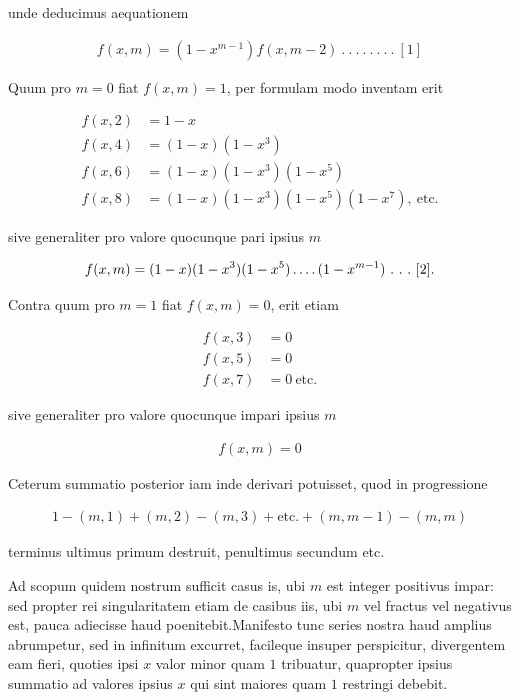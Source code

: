 unde deducimus aequationem

\[
\begin{aligned}
f(x,m)=(1-x^{m-1})f(x,m-2)\ .\ .\ .\ .\ .\ .\ .\ .\ [1]
\end{aligned}
\]


Quum pro $m=0$ fiat $f(x,m)=1$, per formulam modo inventam erit

\[
\begin{aligned}
f(x,2)&=1-x\\
f(x,4)&=(1-x)(1-x^3)\\
f(x,6)&=(1-x)(1-x^3)(1-x^5)\\
f(x,8)&=(1-x)(1-x^3)(1-x^5)(1-x^7),\ \text{etc.}
\end{aligned}
\]

sive generaliter pro valore quocunque pari ipsius $m$

\[
\begin{aligned}
f(x,m)=(1-x)(1-x^3)(1-x^5)\mathinner{.\,.\,.\,.}(1-x^{m-1})\ .\ .\ .\ [2].
\end{aligned}
\]

%
Contra quum pro $m=1$ fiat $f(x,m)=0$, erit etiam

\[
\begin{aligned}
f(x,3)&=0\\
f(x,5)&=0\\
f(x,7)&=0\ \text{etc.}
\end{aligned}
\]

sive generaliter pro valore quocunque impari ipsius $m$

\[
\begin{aligned}
f(x,m)=0
\end{aligned}
\]

Ceterum summatio posterior iam inde derivari potuisset, quod in progressione

\[
\begin{aligned}
1-(m,1)+(m,2)-(m,3)+\text{etc.}+(m,m-1)-(m,m)
\end{aligned}
\]

terminus ultimus primum destruit, penultimus secundum etc.


Ad scopum quidem nostrum sufficit casus is, ubi $m$ est integer positivus impar: sed propter rei singularitatem etiam de casibus iis, ubi $m$ vel fractus vel negativus est, pauca adiecisse haud poenitebit.\quad Manifesto tunc series nostra haud amplius abrumpetur, sed in infinitum excurret, facileque insuper perspicitur, divergentem eam fieri, quoties ipsi $x$ valor minor quam $1$ tribuatur, quapropter ipsius summatio ad valores ipsius $x$ qui sint maiores quam $1$ restringi debebit.

